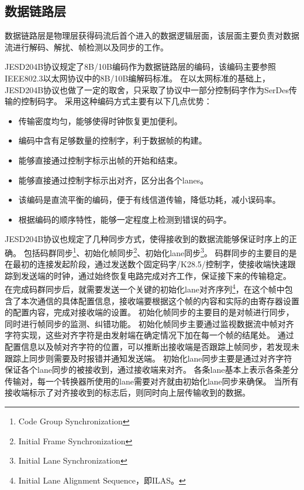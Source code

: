\documentclass[UTF8]{ctexart}
\begin{document}
\subsection{数据链路层}

数据链路层是物理层获得码流后首个进入的数据逻辑层面，该层面主要负责对数据流进行解码、解扰、帧检测以及同步的工作。

JESD204B协议规定了8B/10B编码作为数据链路层的编码，该编码主要参照IEEE802.3以太网协议中的8B/10B编解码标准。
在以太网标准的基础上，JESD204B协议也做了一定的取舍，只采取了协议中一部分控制码字作为SerDes传输的控制码字。
采用这种编码方式主要有以下几点优势：

\begin{itemize}
\item 传输密度均匀，能够使得时钟恢复更加便利。
\item 编码中含有足够数量的控制字，利于数据帧的构建。
\item 能够直接通过控制字标示出帧的开始和结束。
\item 能够直接通过控制字标示出对齐，区分出各个lanes。
\item 该编码是直流平衡的编码，便于有线信道传输，降低功耗，减小误码率。
\item 根据编码的顺序特性，能够一定程度上检测到错误的码字。
\end{itemize}

JESD204B协议也规定了几种同步方式，使得接收到的数据流能够保证时序上的正确。
包括码群同步\footnote{Code Group Synchronization}、初始化帧同步\footnote{Initial Frame Synchronization}、初始化lane同步\footnote{Initial Lane Synchronization}。
码群同步的主要目的是在最初的连接发起阶段，通过发送数个固定码字/K28.5/控制字，使接收端快速跟踪到发送端的时钟，通过始终恢复电路完成对齐工作，保证接下来的传输稳定。
在完成码群同步后，就需要发送一个关键的初始化lane对齐序列\footnote{Initial Lane Alignment Sequence，即ILAS。}，在这个帧中包含了本次通信的具体配置信息，接收端要根据这个帧的内容和实际的由寄存器设置的配置内容，完成对接收端的设置。
初始化帧同步的主要目的是对帧进行同步，同时进行帧同步的监测、纠错功能。
初始化帧同步主要通过监视数据流中帧对齐字符实现，这些对齐字符是由发射端在确定情况下加在每一个帧的结尾处。
通过配置信息以及帧对齐字符的位置，可以推断出接收端是否跟踪上帧同步，若发现未跟踪上同步则需要及时报错并通知发送端。
初始化lane同步主要是通过对齐字符保证各个lane同步的被接收到，通过接收端来对齐。
各条lane基本上表示各条差分传输对，每一个转换器所使用的lane需要对齐就由初始化lane同步来确保。
当所有接收端标示了对齐接收到的标志后，则同时向上层传输收到的数据。
\end{document}
